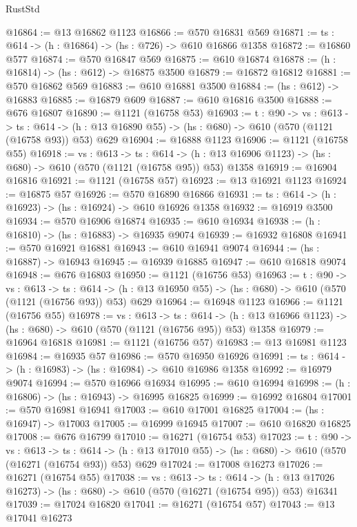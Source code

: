 \begin{lexlean}{RustStd}
\begin{coremodule}
@16864 := @13 @16862 @1123
@16866 := @570 @16831 @569
@16871 := {ts : @614} -> (h : @16864) -> (hs : @726) -> @610 @16866 @1358
@16872 := @16860 @577
@16874 := @570 @16847 @569
@16875 := @610 @16874
@16878 := (h : @16814) -> (hs : @612) -> @16875 @3500
@16879 := @16872 @16812
@16881 := @570 @16862 @569
@16883 := @610 @16881 @3500
@16884 := (hs : @612) -> @16883
@16885 := @16879 @609
@16887 := @610 @16816 @3500
@16888 := @676 @16807
@16890 := @1121 (@16758 @53)
@16903 := {t : @90} ->
  {vs : @613} ->
  {ts : @614} -> (h : @13 @16890 @55) -> (hs : @680) -> @610 (@570 (@1121 (@16758 @93)) @53) @629
@16904 := @16888 @1123
@16906 := @1121 (@16758 @55)
@16918 := {vs : @613} ->
  {ts : @614} -> (h : @13 @16906 @1123) -> (hs : @680) -> @610 (@570 (@1121 (@16758 @95)) @53) @1358
@16919 := @16904 @16816
@16921 := @1121 (@16758 @57)
@16923 := @13 @16921 @1123
@16924 := @16875 @57
@16926 := @570 @16890 @16866
@16931 := {ts : @614} -> (h : @16923) -> (hs : @16924) -> @610 @16926 @1358
@16932 := @16919 @3500
@16934 := @570 @16906 @16874
@16935 := @610 @16934
@16938 := (h : @16810) -> (hs : @16883) -> @16935 @9074
@16939 := @16932 @16808
@16941 := @570 @16921 @16881
@16943 := @610 @16941 @9074
@16944 := (hs : @16887) -> @16943
@16945 := @16939 @16885
@16947 := @610 @16818 @9074
@16948 := @676 @16803
@16950 := @1121 (@16756 @53)
@16963 := {t : @90} ->
  {vs : @613} ->
  {ts : @614} -> (h : @13 @16950 @55) -> (hs : @680) -> @610 (@570 (@1121 (@16756 @93)) @53) @629
@16964 := @16948 @1123
@16966 := @1121 (@16756 @55)
@16978 := {vs : @613} ->
  {ts : @614} -> (h : @13 @16966 @1123) -> (hs : @680) -> @610 (@570 (@1121 (@16756 @95)) @53) @1358
@16979 := @16964 @16818
@16981 := @1121 (@16756 @57)
@16983 := @13 @16981 @1123
@16984 := @16935 @57
@16986 := @570 @16950 @16926
@16991 := {ts : @614} -> (h : @16983) -> (hs : @16984) -> @610 @16986 @1358
@16992 := @16979 @9074
@16994 := @570 @16966 @16934
@16995 := @610 @16994
@16998 := (h : @16806) -> (hs : @16943) -> @16995 @16825
@16999 := @16992 @16804
@17001 := @570 @16981 @16941
@17003 := @610 @17001 @16825
@17004 := (hs : @16947) -> @17003
@17005 := @16999 @16945
@17007 := @610 @16820 @16825
@17008 := @676 @16799
@17010 := @16271 (@16754 @53)
@17023 := {t : @90} ->
  {vs : @613} ->
  {ts : @614} -> (h : @13 @17010 @55) -> (hs : @680) -> @610 (@570 (@16271 (@16754 @93)) @53) @629
@17024 := @17008 @16273
@17026 := @16271 (@16754 @55)
@17038 := {vs : @613} ->
  {ts : @614} ->
  (h : @13 @17026 @16273) -> (hs : @680) -> @610 (@570 (@16271 (@16754 @95)) @53) @16341
@17039 := @17024 @16820
@17041 := @16271 (@16754 @57)
@17043 := @13 @17041 @16273

\end{coremodule}
\end{lexlean}
